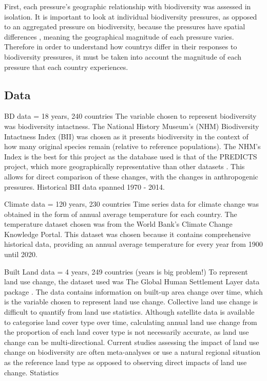 \documentclass[11pt, a4paper, titlepage]{article}
\begin{document}
	First, each pressure's geographic relationship with biodiversity was assessed in isolation. It is important to look at individual biodiversity pressures, as opposed to an aggregated pressure on biodiversity, because the pressures have spatial differences \citep{steffen2015planetary}, meaning the geographical magnitude of each pressure varies. Therefore in order to understand how countrys differ in their responses to biodiversity pressures, it must be taken into account the magnitude of each pressure that each country experiences. \newline
	\subsection*{Data}
	
	BD data = 18 years, 240 countries
	The variable chosen to represent biodiversity was biodiversity intactness. The National History Museum's (NHM) Biodiversity Intactness Index (BII)\citep{Heather2021} was chosen as it presents biodiversity in the context of how many original species remain (relative to reference populations). The NHM's Index is the best for this project as the database used is that of the PREDICTS project, which more geographically representative than other datasets \citep{purvis2018modelling}. This allows for direct comparison of these changes, with the changes in anthropogenic pressures. Historical BII data spanned 1970 - 2014. \newline
	
	Climate data = 120 years, 230 countries
	Time series data for climate change was obtained in the form of annual average temperature for each country. The temperature dataset chosen was from the World Bank's Climate Change Knowledge Portal. This dataset was chosen because it contains comprehensive historical data, providing an annual average temperature for every year from 1900 until 2020. \newline
	
	Built Land data = 4 years, 249 countries (years is big problem!)
	To represent land use change, the dataset used was The Global Human Settlement Layer data package \citep{JRC117104}. The data contains information on built-up area change over time, which is the variable chosen to represent land use change. Collective land use change is difficult to quantify from land use statistics. Although satellite data is available to categorise land cover type over time, calculating annual land use change from the proportion of each land cover type is not necessarily accurate, as land use change can be multi-directional. Current studies assessing the impact of land use change on biodiversity are often meta-analyses or use a natural regional situation as the reference land type \citep{de2013land} as opposed to observing direct impacts of land use change. Statistics \newline
	
\end{document}
